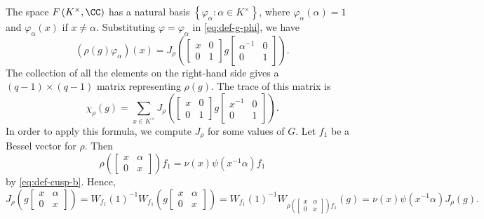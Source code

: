 \documentclass[../main.tex]{subfiles}
\begin{document}
The space $F\left(K^\times,\CC\right)$ has a natural basis $\left\{\varphi_\alpha:\alpha\in K^\times\right\}$, where $\varphi_\alpha(\alpha)=1$ and $\varphi_\alpha(x)$ if $x\ne\alpha$. Substituting $\varphi=\varphi_\alpha$ in \eqref{eq:def-g-phi}, we have
\[(\rho(g)\varphi_\alpha)(x)=J_\rho\left(\begin{bmatrix}
	x & 0 \\
	0 & 1
\end{bmatrix}g\begin{bmatrix}
	\alpha^{-1} & 0 \\
	0 & 1
\end{bmatrix}\right).\]
The collection of all the elements on the right-hand side gives a $(q-1)\times(q-1)$ matrix representing $\rho(g)$. The trace of this matrix is
\begin{equation}
	\chi_\rho(g) = \sum_{x\in K^\times}J_\rho\left(\begin{bmatrix}
		x & 0 \\
		0 & 1
	\end{bmatrix}g\begin{bmatrix}
		x^{-1} & 0 \\
		0 & 1
	\end{bmatrix}\right). \label{eq:chi-cuspidal-formula}
\end{equation}
In order to apply this formula, we compute $J_\rho$ for some values of $G$. Let $f_1$ be a Bessel vector for $\rho$. Then
\[\rho\left(\begin{bmatrix}
	x & \alpha \\
	0 & x
\end{bmatrix}\right)f_1=\nu(x)\psi\left(x^{-1}\alpha\right)f_1\]
by \eqref{eq:def-cusp-b}. Hence,
\[J_\rho\left(g\begin{bmatrix}
	x & \alpha \\
	0 & x
\end{bmatrix}\right)=W_{f_1}(1)^{-1}W_{f_1}\left(g\begin{bmatrix}
	x & \alpha \\
	0 & x
\end{bmatrix}\right)=W_{f_1}(1)^{-1}W_{\rho\left(\begin{bmatrix}
	x & \alpha \\
	0 & x
\end{bmatrix}\right)f_1}(g)=\nu(x)\psi\left(x^{-1}\alpha\right)J_\rho(g).\]
\end{document}
